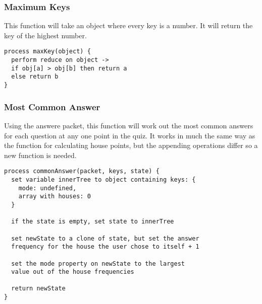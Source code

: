 \subsubsection{Maximum Keys}
This function will take an object where every key is a number. It will return the key of the highest number.
\begin{verbatim}
process maxKey(object) {
  perform reduce on object ->
  if obj[a] > obj[b] then return a
  else return b
}
\end{verbatim}

\subsubsection{Most Common Answer}
Using the answere packet, this function will work out the most common answers for each question at any one point in the quiz. It works in much the same way as the function for calculating house points, but the appending operations differ so a new function is needed.
\begin{verbatim}
process commonAnswer(packet, keys, state) {
  set variable innerTree to object containing keys: {
    mode: undefined,
    array with houses: 0
  }

  if the state is empty, set state to innerTree

  set newState to a clone of state, but set the answer
  frequency for the house the user chose to itself + 1

  set the mode property on newState to the largest
  value out of the house frequencies

  return newState
}
\end{verbatim}
